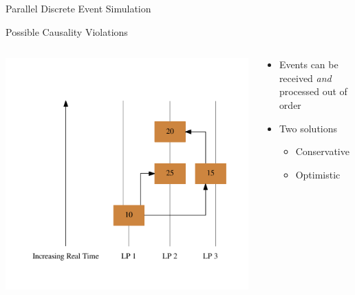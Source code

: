 \documentclass[10pt]{beamer}
\begin{document}
\begin{frame}{Parallel Discrete Event Simulation}
\begin{block}{Possible Causality Violations}
\begin{columns}
        \begin{column}{0.5\textwidth}
            \includegraphics[width=\textwidth]{../figs/graphviz/causality.pdf}
        \end{column}

        \begin{column}{0.5\textwidth}
            \begin{itemize}
                \item Events can be received \emph{and} processed out of order
                  \bigskip
                \item Two solutions
                    \begin{itemize}
                    \item Conservative
                    \item Optimistic
                    \end{itemize}
            \end{itemize}
        \end{column}

        \end{columns}

    \end{block}

\end{frame}
\end{document}
